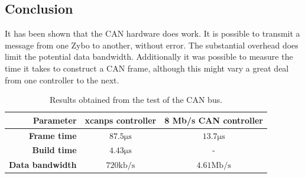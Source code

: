 \subsection{Conclusion}\label{sub:CAN_test_conclusion}
It has been shown that the CAN hardware does work.
It is possible to transmit a message from one Zybo to another, without error.
The substantial overhead does limit the potential data bandwidth.
Additionally it was possible to measure the time it takes to construct a CAN frame, although this might vary a great deal from one controller to the next.

\begin{table}[h!]
	\centering
	\begin{tabular}{r | c | c}
		\textbf{Parameter} & \textbf{xcanps controller} & \textbf{8 Mb/s CAN controller} \\
		\hline
		\textbf{Frame time} & $87.5 \si{\micro\second}$ & $13.7\si{\micro\second}$ \\
		\textbf{Build time} & $4.43 \si{\micro\second}$ & - \\
		\textbf{Data bandwidth} & $720 \mathrm{kb/s}$ & $4.61 \mathrm{Mb/s}$
	\end{tabular}
	\caption{Results obtained from the test of the CAN bus.}
	\label{tab:CAN_test_conclusion}
\end{table}
